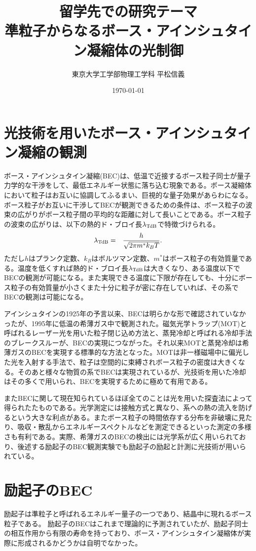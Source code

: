 \documentclass[11pt,a4paper]{jsarticle}
\title{留学先での研究テーマ\\準粒子からなるボース・アインシュタイン凝縮体の光制御}
\author{東京大学工学部物理工学科 平松信義}
\date{\today}
\begin{document}
\maketitle
\thispagestyle{mypagestyle}

\section{光技術を用いたボース・アインシュタイン凝縮の観測}
ボース・アインシュタイン凝縮(BEC)は、低温で近接するボース粒子同士が量子力学的な干渉をして、最低エネルギー状態に落ち込む現象である。ボース凝縮体において粒子はお互いに協調してふるまい、巨視的な量子効果があらわになる。
ボース粒子がお互いに干渉してBECが観測できるための条件は、ボース粒子の波束の広がりがボース粒子間の平均的な距離に対して長いことである。ボース粒子の波束の広がりは、以下の熱的ド・ブロイ長$\lambda_{\rm TdB}$で特徴づけられる。
\begin{eqnarray}
\lambda_{\rm TdB} &=& \frac{h}{\sqrt{2\pi m^* k_B T}}.
\label{eq:lambda}
\end{eqnarray}
ただし$h$はプランク定数、$k_B$はボルツマン定数、$m^*$はボース粒子の有効質量である。温度を低くすれば熱的ド・ブロイ長$\lambda_{\rm TdB}$は大きくなり、ある温度以下でBECの観測が可能になる。また実現できる温度に下限が存在しても、十分にボース粒子の有効質量が小さくまた十分に粒子が密に存在していれば、その系でBECの観測は可能になる。

アインシュタインの1925年の予言以来、BECは明らかな形で確認されていなかったが、1995年に低温の希薄ガス中で観測された\cite{Davis,Anderson}。磁気光学トラップ(MOT)と呼ばれるレーザー光を用いた粒子閉じ込め方法と、蒸発冷却と呼ばれる冷却手法のブレークスルーが、BECの実現につながった。それ以来MOTと蒸発冷却は希薄ガスのBECを実現する標準的な方法となった。MOTは非一様磁場中に偏光した光を入射する手法で、粒子は空間的に束縛されボース粒子の密度は大きくなる。そのあと様々な物質の系でBECは実現されているが、光技術を用いた冷却はその多くで用いられ\cite{ketterle}、BECを実現するために極めて有用である。

またBECに関して現在知られているほぼ全てのことは光を用いた探査法によって得られたたものである\cite{ketterle}。光学測定には接触方式と異なり、系への熱の流入を防げるという大きな利点がある。またボース粒子の時間依存する分布を非破壊に見たり、吸収・散乱からエネルギースペクトルなどを測定できるといった測定の多様さも有利である。実際、希薄ガスのBECの検出には光学系が広く用いられており、後述する励起子のBEC観測実験\cite{Yoshioka}でも励起子の励起と計測に光技術が用いられている。

\section{励起子のBEC}
励起子は準粒子と呼ばれるエネルギー量子の一つであり、結晶中に現れるボース粒子である。
励起子のBECはこれまで理論的に予測されていたが\cite{Blatt}、励起子同士の相互作用から有限の寿命を持っており、ボース・アインシュタイン凝縮体が実際に形成されるかどうかは自明でなかった。
\end{document}
